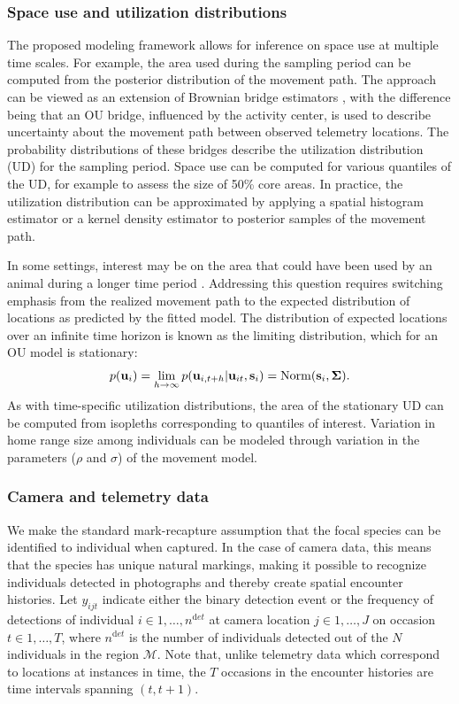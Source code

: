 \documentclass[12pt]{article}
\newcommand{\bsi}{{\bf s}_i}
\newcommand{\bu}{{\bf u}}
\newcommand{\bui}{{\bf u}_i}
\newcommand{\buit}{{\bf u}_{it}}
\begin{document}
\subsubsection{Space use and utilization distributions}

The proposed modeling framework allows for inference on space use at
multiple time scales. For example, the area used during the sampling
period can be computed from the posterior distribution of the movement
path. The approach can be viewed as an extension of Brownian bridge
estimators \citep{horne_etal:2007}, with the difference being that an
OU bridge, influenced by the activity center, is used to describe
uncertainty about the movement path between observed telemetry
locations. The probability distributions of these bridges describe
the utilization distribution (UD) for the sampling period. 
Space use can be computed for various quantiles of
the UD, for example to assess the size of 50\% core areas. 
In practice, the utilization distribution can be approximated by
applying a spatial histogram estimator or a kernel density estimator
to posterior samples of the movement path. 

In some settings, interest may be on the area that could have
been used by an animal during a longer time period \citep{fleming_etal:2015}.
Addressing this question requires switching emphasis from the
realized movement path to the expected distribution of locations as
predicted by the fitted model. The distribution of expected locations
over an infinite time horizon is known as the limiting distribution,
which for an OU model is stationary:
\begin{equation}
  p(\bui) = \lim\limits_{h \to \infty} p(\bu_{i,t+h}|\buit,\bsi) = \mathrm{Norm}(\bsi, \bm{\Sigma}).
  \label{eq:ud}
\end{equation}
As with time-specific utilization distributions, the area of the
stationary UD can be computed from isopleths corresponding to
quantiles of interest.
Variation in home range size among individuals can be modeled through
variation in the parameters ($\rho$ and $\sigma$) of the movement model.


\subsubsection{Camera and telemetry data}

We make the standard mark-recapture assumption that the focal species
can be identified to individual when captured. In the case of
camera data, this means that the species has unique natural
markings, making it possible to recognize individuals detected in
photographs and thereby create spatial encounter histories. Let
$y_{ijt}$ indicate either the binary detection event or the frequency
of detections of individual $i\in 1,\dots,n^{\mathrm det}$ at camera
location $j \in 1,\dots,J$ on occasion $t\in 1,\dots,T$, where
$n^{\mathrm det}$ is the number of individuals detected out of
the $N$ individuals in the 
region $\mathcal{M}$. Note that, unlike telemetry data which
correspond to locations at instances in time, the $T$ occasions in
the encounter histories are time {intervals} spanning $(t,t+1)$.
\end{document}
